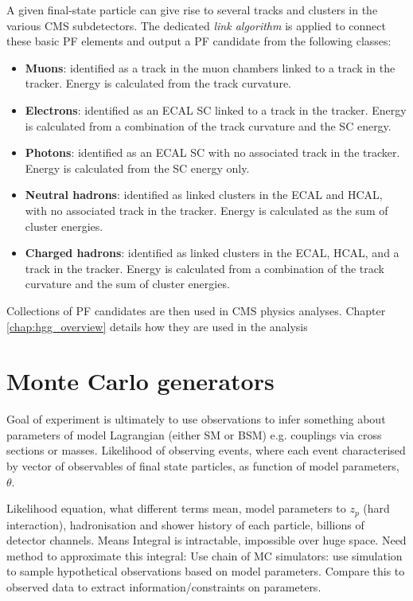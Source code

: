 A given final-state particle can give rise to several tracks and clusters in the various CMS subdetectors. The dedicated \textit{link algorithm} is applied to connect these basic PF elements and output a PF candidate from the following classes:
\begin{itemize}
    \item \textbf{Muons}: identified as a track in the muon chambers linked to a track in the tracker. Energy is calculated from the track curvature.
    \item \textbf{Electrons}: identified as an ECAL SC linked to a track in the tracker. Energy is calculated from a combination of the track curvature and the SC energy. 
    \item \textbf{Photons}: identified as an ECAL SC with no associated track in the tracker. Energy is calculated from the SC energy only.
    \item \textbf{Neutral hadrons}: identified as linked clusters in the ECAL and HCAL, with no associated track in the tracker. Energy is calculated as the sum of cluster energies.
    \item \textbf{Charged hadrons}: identified as linked clusters in the ECAL, HCAL, and a track in the tracker. Energy is calculated from a combination of the track curvature and the sum of cluster energies.
\end{itemize}
\noindent
Collections of PF candidates are then used in CMS physics analyses. Chapter \ref{chap:hgg_overview} details how they are used in the \Hgg analysis

\section{Monte Carlo generators}\label{sec:mc}
Goal of experiment is ultimately to use observations to infer something about parameters of model Lagrangian (either SM or BSM) e.g. couplings via cross sections or masses. Likelihood of observing events, where each event characterised by vector of observables of final state particles, as function of model parameters, $\theta$.

Likelihood equation, what different terms mean, model parameters to $z_p$ (hard interaction), hadronisation and shower history of each particle, billions of detector channels. Means Integral is intractable, impossible over huge space. Need method to approximate this integral: Use chain of MC simulators: use simulation to sample hypothetical observations based on model parameters. Compare this to observed data to extract information/constraints on parameters.

